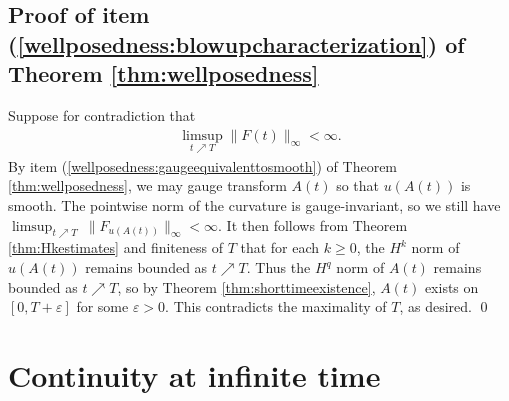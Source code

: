 \documentclass[12pt]{amsart}
\renewcommand{\1}{{\mathbf 1}}
\theoremstyle{others}
\numberwithin{equation}{section}
\begin{document}
\subsection{Proof of item (\ref{wellposedness:blowupcharacterization}) of Theorem \ref{thm:wellposedness}} \label{ltecriterion}
    Suppose for %
    contradiction that
    \begin{align*}
        \limsup_{t \nearrow T} \|F(t)\|_\infty < \infty.
    \end{align*} By item (\ref{wellposedness:gaugeequivalenttosmooth}) of Theorem \ref{thm:wellposedness}, we may gauge transform \(A(t)\) so that \(u(A(t))\) is smooth. The pointwise norm of the curvature is gauge-invariant, so we still have \(\limsup_{t \nearrow T}\ \|F_{u(A(t))}\|_\infty < \infty\). It then follows from Theorem \ref{thm:Hkestimates} and finiteness of \(T\) that for each \(k \geq 0\), the \(H^k\) norm of \(u(A(t))\) remains bounded as \(t \nearrow T\). Thus the \(H^q\) norm of \(A(t)\) remains bounded as \(t \nearrow T\), so by Theorem \ref{thm:shorttimeexistence}, \(A(t)\) exists on \([0, T + \varepsilon]\) for some \(\varepsilon > 0\). This contradicts the maximality of \(T\), as desired. \qed





\vspace{10mm}


\section{Continuity at infinite time}
\end{document}
